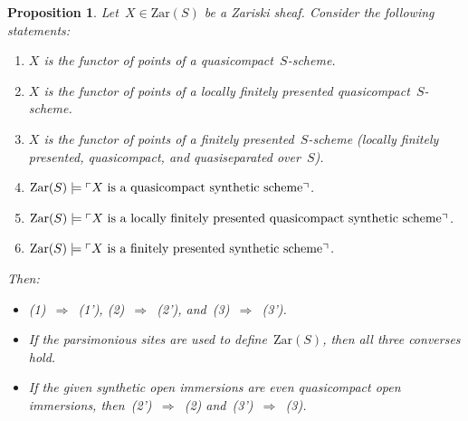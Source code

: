 \documentclass[10pt,reqno,a4paper]{amsbook}
\theoremstyle{definition}
\theoremstyle{plain}
\newtheorem{prop}[defn]{Proposition}
\theoremstyle{remark}
\newcommand{\Zar}{\mathrm{Zar}}
\newcommand{\?}{\,{:}\,}
\renewcommand{\_}{\mathpunct{.}\,}
\newcommand{\speak}[1]{\ulcorner\text{\textnormal{#1}}\urcorner}
\begin{document}
\begin{prop}\label{prop:synthetic-schemes}
Let~$X \in \Zar(S)$ be a Zariski sheaf. Consider the following
statements:
\begin{enumerate}
\item $X$ is the functor of points of a quasicompact~$S$-scheme.
\item $X$ is the functor of points of a locally finitely presented quasicompact~$S$-scheme.
\item $X$ is the functor of points of a finitely presented~$S$-scheme (locally
finitely presented, quasicompact, and quasiseparated over~$S$).
\item[(1')] $\Zar(S) \models \speak{$X$ is a quasicompact synthetic scheme}$.
\item[(2')] $\Zar(S) \models \speak{$X$ is a locally finitely presented quasicompact synthetic scheme}$.
\item[(3')] $\Zar(S) \models \speak{$X$ is a finitely presented synthetic scheme}$.
\end{enumerate}
Then:
\begin{itemize}
\item (1)~$\Rightarrow$~(1'), (2)~$\Rightarrow$~(2'), and~(3)~$\Rightarrow$~(3'). 
\item If the parsimonious sites are used to define~$\Zar(S)$, then all three
converses hold.
\item If the given synthetic open immersions are even quasicompact open
immersions, then~(2')~$\Rightarrow$~(2) and~(3')~$\Rightarrow$~(3).
\end{itemize}
\end{prop}
\end{document}
